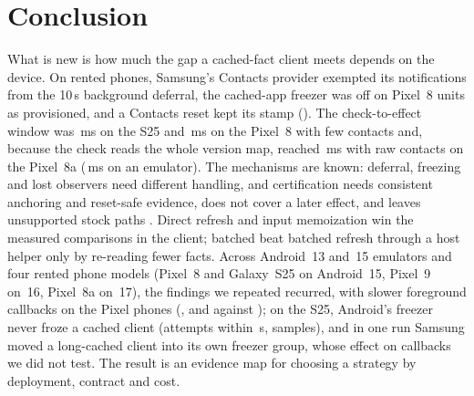\section{Conclusion}
\label{sec:conclusion}
What is new is how much the gap a cached-fact client meets depends on the device. On rented phones,\ifPhysSamsung{} Samsung's Contacts provider exempted its notifications from the 10\,s background deferral,\fi{} the cached-app freezer was off on \PhysFreezerOffTrialUnits Pixel~8 units as provisioned, and a Contacts reset kept its stamp (\PhysResetSameStamp). The check-to-effect window was \PhysSamsungCteMsInt\,ms on the S25 and \PhysCteMsInt\,ms on the Pixel~8 with few contacts and, because the check reads the whole version map, reached \PhysEightAScaleFiveKCte\,ms with \PhysEightAScaleFiveKRaw raw contacts on the Pixel~8a (\ScaleContactsFivezerozerozeroCte\,ms on an emulator). The mechanisms are known: deferral, freezing and lost observers need different handling, and certification needs consistent anchoring and reset-safe evidence, does not cover a later effect, and leaves unsupported stock paths \Unknown. Direct refresh and input memoization win the measured comparisons in the client\ifPhysHost; batched \stamp beat batched refresh through a host helper only by re-reading fewer facts\fi. Across Android~13 and~15 emulators and four rented phone models (Pixel~8 and Galaxy~S25 on Android~15, Pixel~9 on~16, Pixel~8a on~17), the findings we repeated recurred, with slower foreground callbacks on the Pixel phones (\PhysDeployFgMedian, \PhysNineFgMedian and \PhysEightAFgMedian against \FollowAFg)\ifPhysSamsung; on the S25, Android's freezer never froze a cached client (\PhysSamsungFrozen attempts within \PhysSamsungFreezeWindowS\,s, \PhysSamsungLongAndroidFrozen samples), and in one run Samsung moved a long-cached client into its own freezer group, whose effect on callbacks we did not test\fi. The result is an evidence map for choosing a strategy by deployment, contract and cost.
